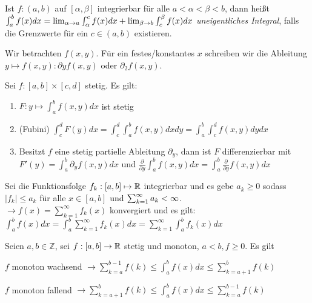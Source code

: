 \begin{definition}
	Ist $f : (a,b)$ auf $[\alpha, \beta]$ integrierbar für alle $a < \alpha < \beta < b$, dann heißt $\int_{a}^{b} f(x) dx = \lim_{\alpha \rightarrow a} \int_{\alpha}^{c} f(x) dx + \lim_{\beta \rightarrow b} \int_{c}^{\beta} f(x) dx$ \emph{uneigentliches Integral}, falls die Grenzwerte für ein $c \in (a,b)$ existieren.
\end{definition}

\begin{definition}
	Wir betrachten $f(x,y)$. Für ein festes/konstantes $x$ schreiben wir die Ableitung $y \mapsto f(x,y) : \partial y f(x,y)$ oder $\partial_2 f(x,y)$.
\end{definition}

\begin{satz}
	Sei $f : [a,b] \times [c,d]$ stetig. Es gilt:
	\begin{enumerate}[noitemsep]
		\item $F : y \mapsto \int_{a}^{b} f(x,y) dx$ ist stetig
		\item (Fubini) $\int_{c}^{d} F(y) dx= \int_{c}^{d} \int_{a}^{b} f(x,y) dx dy =  \int_{a}^{b} \int_{c}^{d} f(x,y) dy dx $
		\item Besitzt $f$ eine stetig partielle Ableitung $\partial_y$, dann ist $F$ differenzierbar mit $F'(y) = \int_{a}^{b} \partial_y f(x,y) dx$ und $\frac{\partial}{\partial y} \int_{a}^{b} f(x,y) dx = \int_{a}^{b} \frac{\partial}{\partial y} f(x,y) dx$ 
	\end{enumerate}
\end{satz}

\begin{satz}
	Sei die Funktionsfolge $f_k : [a,b] \mapsto \mathbb{R}$ integrierbar und es gebe $a_k \geq 0$ sodass $|f_k| \leq a_k$ für alle $x \in [a,b]$ und $\sum_{k = 1}^{\infty} a_{k} < \infty$. \\
	$\rightarrow f(x) = \sum_{k=1}^{\infty} f_k(x)$ konvergiert und es gilt: $\int_{a}^{b}f(x)dx = \int_{a}^{b} \sum_{k=1}^{\infty} f_k(x)dx =  \sum_{k=1}^{\infty} \int_{a}^{b}f_k(x) dx$
\end{satz}

\begin{satz}
	Seien $a,b \in \mathbb{Z}$, sei $f : [a,b] \rightarrow \mathbb{R}$ stetig und monoton, $a < b, f \geq 0$. Es gilt
	\begin{description}[noitemsep]
		\item $f$ monoton wachsend $\rightarrow \sum_{k=a}^{b-1} f(k) \leq \int_{a}^{b}f(x)dx \leq \sum_{k=a+1}^{b}f(k)$
		\item $f$ monoton fallend  $\rightarrow \sum_{k=a+1}^{b} f(k) \leq \int_{a}^{b}f(x)dx \leq \sum_{k=a}^{b-1}f(k)$
	\end{description}
\end{satz}

